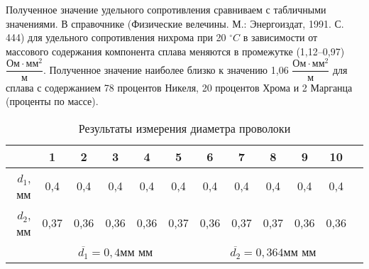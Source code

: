 \documentclass[a4paper, 10pt]{article}%
\begin{document}
Полученное значение удельного сопротивления сравниваем с табличными значениями. В справочнике (Физические велечины. М.: Энергоиздат, 1991. С. 444) для удельного сопротивления нихрома при 20 $ ^\circ C$ в зависимости от массового содержания компонента сплава меняются в промежутке (1,12--0,97) $\dfrac{\text{Ом} \cdot \text{мм}^2}{\text{м}}$. Полученное значение наиболее близко к значению 1,06 $\dfrac{\text{Ом} \cdot \text{мм}^2}{\text{м}}$ для сплава с содержанием 78 процентов Никеля, 20 процентов Хрома и 2 Марганца (проценты по массе).
\newpage
\begin{table}
	\caption{Результаты измерения диаметра проволоки}
	\begin{tabular}{|r|c|c|c|c|c|c|c|c|c|c|c|}
	\hline
& 1 & 2 & 3 & 4 & 5 & 6 & 7 & 8 & 9 & 10\\
\hline
$d_1$, мм & 0,4 & 0,4 & 0,4 & 0,4 & 0,4 & 0,4 & 0,4 & 0,4 & 0,4 & 0,4 \\
\hline
$d_2$, мм & 0,37 & 0,36 & 0,36 & 0,36 & 0,37 & 0,36 & 0,37 & 0,37 & 0,36 & 0,36 \\
\hline
\multicolumn{1}{|r|}{} & \multicolumn{5}{c}{ \( \overline{d_{1}} = 0,4 мм \) мм}  & \multicolumn{5}{c|}{ \( \overline{d_{2}} = 0,364 мм \) мм}\\
\hline
\end{tabular}
\end{table}
\end{document}
